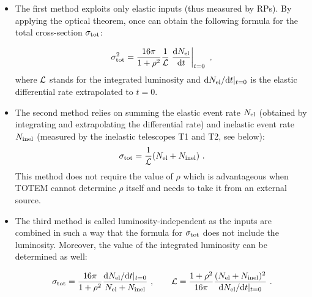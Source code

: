 \documentclass{desyproc}
\def\d{{\rm d}}
\begin{document}
\begin{itemize}

\item The first method exploits only elastic inputs (thus measured by RPs). By applying the optical theorem, once can obtain the following formula for the total cross-section $\sigma_{\rm tot}$:

\begin{equation}\label{eq:si tot m1}
\sigma_{\rm tot}^2 = {16\pi\over 1+\rho^2} {1\over {\cal L}} \left. {\d N_{\rm el}\over \d t}\right |_{t = 0}\ ,
\end{equation}
where ${\cal L}$ stands for the integrated luminosity and $\d N_{\rm el}/\d t|_{t = 0}$ is the elastic differential rate extrapolated to $t = 0$.

\eject

\item The second method relies on summing the elastic event rate $N_{\rm el}$ (obtained by integrating and extrapolating the differential rate) and inelastic event rate $N_{\rm inel}$ (measured by the inelastic telescopes T1 and T2, see below):
\begin{equation}\label{eq:si tot m2}
\sigma_{\rm tot} = {1\over {\cal L}} (N_{\rm el} + N_{\rm inel})\ .
\end{equation}
This method does not require the value of $\rho$ which is advantageous when TOTEM cannot determine $\rho$ itself and needs to take it from an external source.

\item The third method is called luminosity-independent as the inputs are combined in such a way that the formula for $\sigma_{\rm tot}$ does not include the luminosity. Moreover, the value of the integrated luminosity can be determined as well:

\begin{equation}\label{eq:si tot m3}
\sigma_{\rm tot} = {16\pi\over 1+\rho^2} {\d N_{\rm el}/ \d t |_{t = 0}\over N_{\rm el} + N_{\rm inel} }\ ,\qquad
{\cal L} = {1+\rho^2\over 16\pi} {( N_{\rm el} + N_{\rm inel})^2 \over \d N_{\rm el}/ \d t |_{t = 0}}\ .
\end{equation}

\end{itemize}
\end{document}
